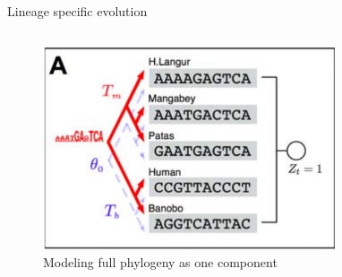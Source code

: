 \documentclass[10pt]{beamer}
\begin{document}
\begin{frame}[fragile]{Lineage specific evolution}
   \begin{columns}[T,onlytextwidth]
    \begin{figure}
		\includegraphics[width=0.77\textwidth]{images/monkey-model.png}
        \caption{Modeling full phylogeny as one component}
	\end{figure}
    \end{columns}
\end{frame}
\end{document}

